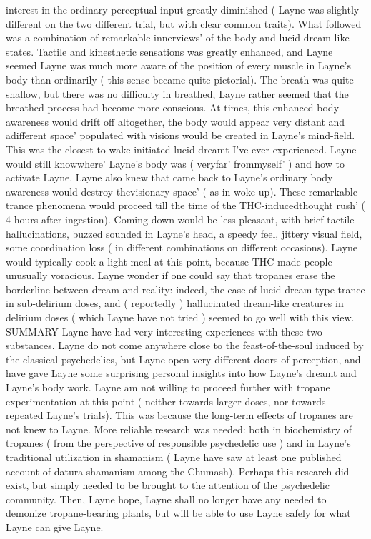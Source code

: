 \documentclass[12pt]{book}
\begin{document}
interest in the ordinary perceptual input greatly diminished ( Layne was slightly different on the two different trial, but with clear common traits). What followed was a combination of remarkable innerviews' of the body and lucid dream-like states. Tactile and kinesthetic sensations was greatly enhanced, and Layne seemed Layne was much more aware of the position of every muscle in Layne's body than ordinarily ( this sense became quite pictorial). The breath was quite shallow, but there was no difficulty in breathed, Layne rather seemed that the breathed process had become more conscious. At times, this enhanced body awareness would drift off altogether, the body would appear very distant and adifferent space' populated with visions would be created in Layne's mind-field. This was the closest to wake-initiated lucid dreamt I've ever experienced. Layne would still knowwhere' Layne's body was ( veryfar' frommyself' ) and how to activate Layne. Layne also knew that came back to Layne's ordinary body awareness would destroy thevisionary space' ( as in woke up). These remarkable trance phenomena would proceed till the time of the THC-inducedthought rush' ( 4 hours after ingestion). Coming down would be less pleasant, with brief tactile hallucinations, buzzed sounded in Layne's head, a speedy feel, jittery visual field, some coordination loss ( in different combinations on different occasions). Layne would typically cook a light meal at this point, because THC made people unusually voracious. Layne wonder if one could say that tropanes erase the borderline between dream and reality: indeed, the ease of lucid dream-type trance in sub-delirium doses, and ( reportedly ) hallucinated dream-like creatures in delirium doses ( which Layne have not tried ) seemed to go well with this view. SUMMARY Layne have had very interesting experiences with these two substances. Layne do not come anywhere close to the feast-of-the-soul induced by the classical psychedelics, but Layne open very different doors of perception, and have gave Layne some surprising personal insights into how Layne's dreamt and Layne's body work. Layne am not willing to proceed further with tropane experimentation at this point ( neither towards larger doses, nor towards repeated Layne's trials). This was because the long-term effects of tropanes are not knew to Layne. More reliable research was needed: both in biochemistry of tropanes ( from the perspective of responsible psychedelic use ) and in Layne's traditional utilization in shamanism ( Layne have saw at least one published account of datura shamanism among the Chumash). Perhaps this research did exist, but simply needed to be brought to the attention of the psychedelic community. Then, Layne hope, Layne shall no longer have any needed to demonize tropane-bearing plants, but will be able to use Layne safely for what Layne can give Layne.
\end{document}
